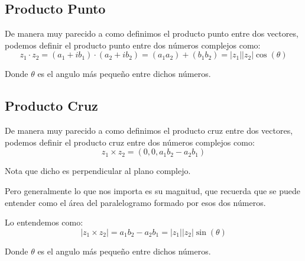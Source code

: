\documentclass[12pt, fleqn]{report}                             %
\newcommand \Quote {\qq}                                        %
\newcommand{\Wrap}[1]{\left( #1 \right)}                        %
\newcommand{\Cos}[1]{\cos\Wrap{#1}}                             %
\newcommand{\Sin}[1]{\sin\Wrap{#1}}                             %
\begin{document}
            \subsection{Producto Punto}

                De manera muy parecido a como definimos el producto punto entre dos
                vectores, podemos definir el producto punto entre dos números complejos
                como:
                \begin{equation}
                    z_1 \cdot z_2
                        = (a_1 + ib_1) \cdot (a_2 + ib_2)
                        = (a_1 a_2) + (b_1 b_2)
                        = |z_1||z_2| \Cos{\theta}
                \end{equation}

                Donde $\theta$ es el angulo más pequeño entre dichos números.


            \subsection{Producto Cruz}

                De manera muy parecido a como definimos el producto cruz entre dos
                vectores, podemos definir el producto cruz entre dos números complejos
                como:
                \begin{equation}
                    z_1 \times z_2 = (0, 0, a_1 b_2 - a_2 b_1)
                \end{equation}

                Nota que dicho \Quote{vector} es perpendicular al plano complejo.

                Pero generalmente lo que nos importa es su magnitud, que recuerda
                que se puede entender como el área del paralelogramo formado por
                esos dos números.

                Lo entendemos como:
                \begin{equation}
                    |z_1 \times z_2|
                        = a_1 b_2 - a_2 b_1 
                        = |z_1||z_2| \Sin{\theta}
                \end{equation}

                Donde $\theta$ es el angulo más pequeño entre dichos números.
\end{document}
